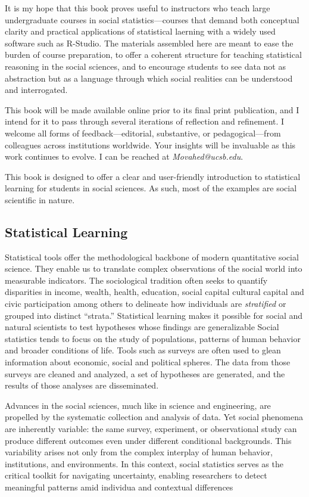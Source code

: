 \documentclass[
  letterpaper,
  DIV=11,
  numbers=noendperiod]{scrreprt}
\begin{document}
It is my hope that this book proves useful to instructors who teach
large undergraduate courses in social statistics---courses that demand
both conceptual clarity and practical applications of statistical
laerning with a widely used software such as R-Studio. The materials
assembled here are meant to ease the burden of course preparation, to
offer a coherent structure for teaching statistical reasoning in the
social sciences, and to encourage students to see data not as
abstraction but as a language through which social realities can be
understood and interrogated.

This book will be made available online prior to its final print
publication, and I intend for it to pass through several iterations of
reflection and refinement. I welcome all forms of feedback---editorial,
substantive, or pedagogical---from colleagues across institutions
worldwide. Your insights will be invaluable as this work continues to
evolve. I can be reached at \emph{Movahed@ucsb.edu}.

This book is designed to offer a clear and user-friendly introduction to
statistical learning for students in social sciences. As such, most of
the examples are social scientific in nature.

\subsection{Statistical Learning}\label{statistical-learning}

Statistical tools offer the methodological backbone of modern
quantitative social science. They enable us to translate complex
observations of the social world into measurable indicators. The
sociological tradition often seeks to quantify disparities in income,
wealth, health, education, social capital cultural capital and civic
participation among others to delineate how individuals are
\emph{stratified} or grouped into distinct ``strata.'' Statistical
learning makes it possible for social and natural scientists to test
hypotheses whose findings are generalizable Social statistics tends to
focus on the study of populations, patterns of human behavior and
broader conditions of life. Tools such as surveys are often used to
glean information about economic, social and political spheres. The data
from those surveys are cleaned and analyzed, a set of hypotheses are
generated, and the results of those analyses are disseminated.

Advances in the social sciences, much like in science and engineering,
are propelled by the systematic collection and analysis of data. Yet
social phenomena are inherently variable: the same survey, experiment,
or observational study can produce different outcomes even under
different conditional backgrounds. This variability arises not only from
the complex interplay of human behavior, institutions, and environments.
In this context, social statistics serves as the critical toolkit for
navigating uncertainty, enabling researchers to detect meaningful
patterns amid individua and contextual differences
\end{document}

